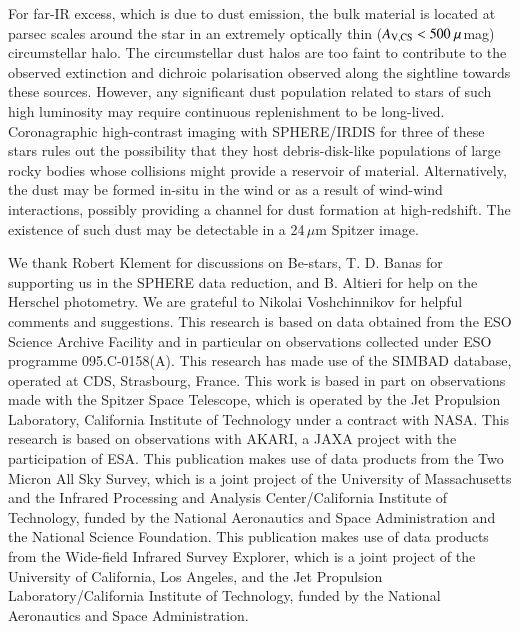 \documentclass[tradiabstract]{aa} %
\begin{document}
For far-IR excess, which is due to dust emission, the bulk material is
located at parsec scales around the star in an extremely optically thin
($A_{\rm V, CS} < 500 \ \mu$mag) circumstellar halo. The circumstellar
dust halos are too faint to contribute to the observed extinction and
dichroic polarisation observed along the sightline towards these
sources. However, any significant dust population related to stars of
such high luminosity may require continuous replenishment to be
long-lived. Coronagraphic high-contrast imaging with SPHERE/IRDIS  for three of these stars rules
out the possibility that they  host debris-disk-like populations of
large rocky bodies whose collisions might provide a reservoir of
material.  Alternatively, the dust may be formed in-situ in the wind
or as a result of wind-wind interactions, possibly providing a channel
for dust formation at high-redshift. The existence of such dust may be detectable in a 24\,$\mu$m Spitzer image.





\begin{acknowledgements}
  We thank Robert Klement for discussions on Be-stars, T. D. Banas for
  supporting us in the SPHERE data reduction, and B. Altieri for help
  on the Herschel photometry. We are grateful to Nikolai Voshchinnikov
  for helpful comments and suggestions.  This research is based on
  data obtained from the ESO Science Archive Facility and in
  particular on observations collected under ESO programme
  095.C-0158(A).  This research has made use of the SIMBAD database,
  operated at CDS, Strasbourg, France. This work is based in part on
  observations made with the Spitzer Space Telescope, which is
  operated by the Jet Propulsion Laboratory, California Institute of
  Technology under a contract with NASA. This research is based on
  observations with AKARI, a JAXA project with the participation of
  ESA. This publication makes use of data products from the Two Micron
  All Sky Survey, which is a joint project of the University of
  Massachusetts and the Infrared Processing and Analysis
  Center/California Institute of Technology, funded by the National
  Aeronautics and Space Administration and the National Science
  Foundation. This publication makes use of data products from the
  Wide-field Infrared Survey Explorer, which is a joint project of the
  University of California, Los Angeles, and the Jet Propulsion
  Laboratory/California Institute of Technology, funded by the
  National Aeronautics and Space Administration.
\end{acknowledgements}
\end{document}
